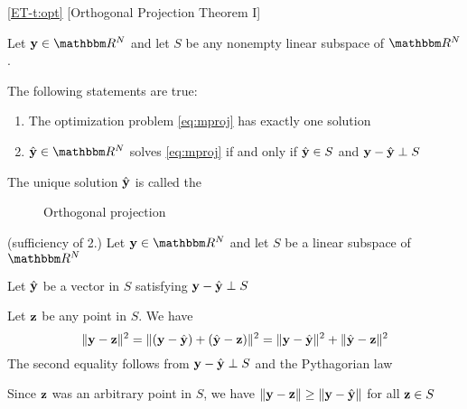 \begin{frame}
    
     \vspace{2em}
    \Thm\eqref{ET-t:opt}
    [Orthogonal Projection Theorem I]
    
    Let $\boldy \in \RR^N$ and let $S$ be any nonempty linear subspace of $\RR^N$. 
    
    The
    following statements are true:
    \begin{enumerate}
        \item  The optimization problem \eqref{eq:mproj} has exactly one solution
        \item $\hboldy \in \RR^N$ solves \eqref{eq:mproj}
            if and only if $\hat {{\mathbf y}} \in S$ and ${\mathbf y} - \hat {{\mathbf y}} \perp
            S$
    \end{enumerate}
    
    \vspace{.7em}
    The unique solution $\hat {\mathbf y}$ is called the 

\end{frame}

\begin{frame}

    \vspace{2em}
    \begin{figure}
       \begin{center}
        
        \caption{\label{f:orth_proj2D0} Orthogonal projection}
       \end{center}
    \end{figure}

\end{frame}

\begin{frame}

     \vspace{2em}
    \Prf (sufficiency of 2.)
    Let $\boldy \in \RR^N$
    and let $S$ be a linear subspace of $\RR^N$
    
    Let $\hat {{\mathbf y}}$ be a vector in
    $S$ satisfying ${\mathbf y} - \hat {{\mathbf y}} \perp S$
    
    Let ${\mathbf z}$ be any point in $S$. We have
    \begin{equation*}
    \| {\mathbf y} - {\mathbf z} \|^2
    = \| ({\mathbf y} - \hat {{\mathbf y}}) + (\hat {{\mathbf y}} - {\mathbf z}) \|^2
    = \| {\mathbf y} - \hat {{\mathbf y}} \|^2  + \| \hat {{\mathbf y}} - {\mathbf z}  \|^2
    \end{equation*}
    The second equality follows from ${\mathbf y} - \hat {{\mathbf y}} \perp S$ and the 
    Pythagorian law
    
    \vspace{.7em}
    Since ${\mathbf z}$ was an arbitrary point in $S$,
    we have $\| {\mathbf y} - {\mathbf z} \| \geq \| {\mathbf y} - \hat {{\mathbf y}} \|$
    for all ${\mathbf z} \in S$
    
\end{frame}

